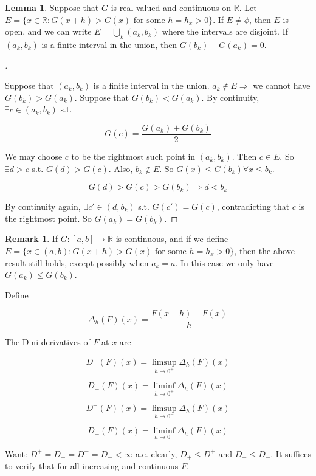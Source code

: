 \documentclass{article}
\theoremstyle{definition}
\newtheorem{lem}{Lemma}
\newtheorem{rem}{Remark}
\newenvironment{proofs}[1][\proofname]{%
  \begin{proof}[#1]$ $\par\nobreak\ignorespaces
}{%
  \end{proof}
}
\begin{document}
\begin{lem}
  Suppose that $G$ is real-valued and continuous on $\mathbb{R}$. Let $E = \{x \in \mathbb{R}: G(x + h) > G(x) \text{ for some } h = h_x > 0 \}$. If $E \neq \phi$, then $E$ is open, and we can write $E = \bigcup_k (a_k, b_k)$ where the intervals are disjoint. If $(a_k, b_k)$ is a finite interval in the union, then $G(b_k) - G(a_k) = 0$.  
\end{lem}

\begin{proofs}
  Suppose that $(a_k, b_k)$ is a finite interval in the union. $a_k \notin E \Rightarrow $ we cannot have $G(b_k) > G(a_k)$. Suppose that $G(b_k) < G(a_k)$. By continuity, $\exists c \in (a_k, b_k)$ s.t. 

  $$G(c) = \frac{G(a_k) + G(b_k)}{2}$$

  We may choose $c$ to be the rightmost such point in $(a_k, b_k)$. Then $c \in E$. So $\exists d > c$ s.t. $G(d) > G(c)$. Also, $b_k \notin E$. So $G(x) \leq G(b_k) \forall x \leq b_k$. 

  $$G(d) > G(c) > G(b_k) \Rightarrow d < b_k$$

  By continuity again, $\exists c' \in (d, b_k)$ s.t. $G(c') = G(c)$, contradicting that $c$ is the rightmost point. So $G(a_k) = G(b_k)$. 
\end{proofs}

\begin{rem}
  If $G:[a, b] \rightarrow \mathbb{R}$ is continuous, and if we define $E = \{ x \in (a, b): G(x + h) > G(x) \text{ for some } h = h_x > 0 \}$, then the above result still holds, except possibly when $a_k = a$. In this case we only have $G(a_k) \leq G(b_k)$. 
\end{rem}

Define 

$$\Delta_h (F)(x) = \frac{F(x + h) - F(x)}{h}$$

The Dini derivatives of $F$ at $x$ are

$$D^+(F)(x) = \limsup_{h \to 0^+} \Delta_h (F)(x)$$

$$D_+(F)(x) = \liminf_{h \to 0^+} \Delta_h (F)(x)$$

$$D^-(F)(x) = \limsup_{h \to 0^-} \Delta_h (F)(x)$$

$$D_-(F)(x) = \liminf_{h \to 0^-} \Delta_h (F)(x)$$

Want: $D^+ = D_+ = D^- = D_- < \infty$ a.e. clearly, $D_+ \leq D^+$ and $D_- \leq D_-$. It suffices to verify that for all increasing and continuous $F$, 
\end{document}
